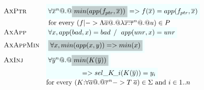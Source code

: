 \begin{figure}
{\[\begin{array}{c}
\begin{array}{lll}
 \textsc{AxPtr}  & \formula{\forall \oln{x}{n} @.@ \highlight{min(app(f_{ptr},\xs))} => f(\ol{x}) = app(f_{ptr},\xs)} \\
                 & \text{ for every } (f |-> \Lambda\as @.@ \lambda\oln{x{:}\tau}{n} @.@ u) \in P \\
 \textsc{AxApp}  & \formula{\forall x, app(\bad,x) = \bad \; /\ \; app(\unr,x) = \unr}    \\ 
 \textsc{AxAppMin}& \formula{\highlight{\forall x, min(app(x,y)) => min(x)}} \\ 
 \textsc{AxInj}   & \formula{\forall \oln{y}{n} @.@ \highlight{min(K(\ys))}} \\ %
                  & \formula{\quad\qquad\qquad => \sel{K}{i}(K(\ys)) = y_i} \\ 
                  & \text{for every } (K{:}\forall\as @.@ \oln{\tau}{n} -> T\;\as) \in \Sigma \text{ and } i \in 1..n 
\end{array}

\end{array}\]}
\end{figure}
